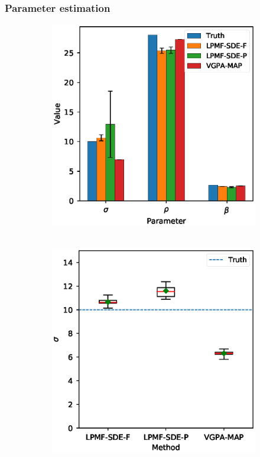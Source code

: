 \subsubsection*{Parameter estimation}

\begin{figure}
    \centering
    \begin{subfigure}{0.48\textwidth}
        \includegraphics[width=\linewidth]{graphics/lorenz-63-parameters}
        \caption{\ }
        \label{fig-lorenz-63-parameters}
    \end{subfigure}
    \begin{subfigure}{0.48\textwidth}
        \includegraphics[width=\linewidth]{graphics/lorenz-63-parameters-sigma-boxplot}

\end{subfigure}
\end{figure}
